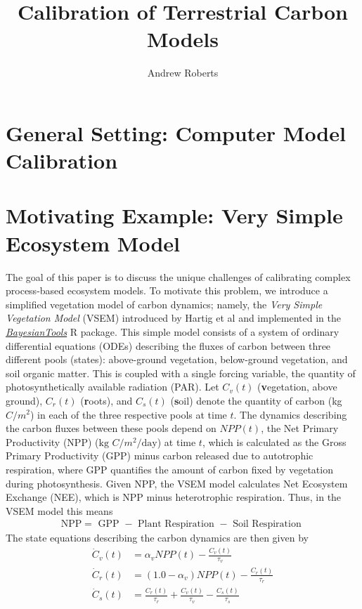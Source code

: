 \documentclass[12pt]{article}
\title{Calibration of Terrestrial Carbon Models}
\author{Andrew Roberts}
\begin{document}
\maketitle
\tableofcontents
\newpage

\section{General Setting: Computer Model Calibration}
\section{Motivating Example: Very Simple Ecosystem Model}
The goal of this paper is to discuss the unique challenges of calibrating complex process-based ecosystem models. To motivate this problem, we introduce 
a simplified vegetation model of carbon dynamics; namely, the \textit{Very Simple Vegetation Model} (VSEM) introduced by Hartig et al \cite{Hartig} and implemented 
in the \href{https://github.com/florianhartig/BayesianTools}{\textit{BayesianTools}} R package. 
This simple model consists of a system of ordinary differential equations (ODEs) describing the fluxes of carbon between three different pools (states): 
above-ground vegetation, below-ground vegetation, and soil organic matter. This is coupled with a single forcing variable, the quantity of photosynthetically 
available radiation (PAR). Let $C_v(t)$ (\textbf{v}egetation, above ground), $C_r(t)$ (\textbf{r}oots), and $C_s(t)$ (\textbf{s}oil) denote the quantity of carbon (kg $C/m^2$) in each of the three respective pools at time $t$. 
The dynamics describing the carbon fluxes between these pools depend on $NPP(t)$, the Net Primary Productivity (NPP) ($\text{kg } C/m^2/\text{day}$) at time $t$, 
which is calculated as the Gross Primary Productivity (GPP) minus carbon released due to autotrophic respiration, where GPP quantifies the amount of carbon 
fixed by vegetation during photosynthesis. Given NPP, the VSEM model calculates Net Ecosystem Exchange (NEE), which is NPP minus heterotrophic 
respiration. Thus, in the VSEM model this means 
\begin{align}
\text{NPP} = \text{ GPP } - \text{ Plant Respiration } - \text{ Soil Respiration } 
\end{align}
The state equations describing the carbon dynamics are then given by 
\begin{align}
\dot{C}_v(t) &= \alpha_v NPP(t) - \frac{C_v(t)}{\tau_v} \\
\dot{C}_r(t) &= (1.0 - \alpha_v) NPP(t) - \frac{C_r(t)}{\tau_r} \nonumber \\
\dot{C}_s(t) &= \frac{C_r(t)}{\tau_r} + \frac{C_v(t)}{\tau_v} - \frac{C_s(t)}{\tau_s} \nonumber 
\end{align}
\end{document}
